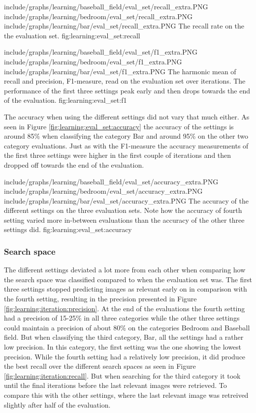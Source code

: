 \tripfigurenear
{include/graphs/learning/baseball_field/eval_set/recall_extra.PNG}
{include/graphs/learning/bedroom/eval_set/recall_extra.PNG}
{include/graphs/learning/bar/eval_set/recall_extra.PNG}
{The recall rate on the the evaluation set.}
{fig:learning:eval_set:recall}

\tripfigurenear
{include/graphs/learning/baseball_field/eval_set/f1_extra.PNG}
{include/graphs/learning/bedroom/eval_set/f1_extra.PNG}
{include/graphs/learning/bar/eval_set/f1_extra.PNG}
{The harmonic mean of recall and precision, F1-measure, read on the evaluation set over iterations. The performance of the first three settings peak early and then drops towards the end of the evaluation.}
{fig:learning:eval_set:f1}

The accuracy when using the different settings did not vary that much either. As seen in Figure \ref{fig:learning:eval_set:accuracy} the accuracy of the settings is around 85\% when classifying the category Bar and around 95\% on the other two category evaluations. Just as with the F1-measure the accuracy measurements of the first three settings were higher in the first couple of iterations and then dropped off towards the end of the evaluation. 

\tripfigure
{include/graphs/learning/baseball_field/eval_set/accuracy_extra.PNG}
{include/graphs/learning/bedroom/eval_set/accuracy_extra.PNG}
{include/graphs/learning/bar/eval_set/accuracy_extra.PNG}
{The accuracy of the different settings on the three evaluation sets. Note how the accuracy of fourth setting varied more in-between evaluations than the accuracy of the other three settings did.}
{fig:learning:eval_set:accuracy}

\subsubsection{Search space}
\label{sec:res:learning:iter}
The different settings deviated a lot more from each other when comparing how the search space was classified compared to when the evaluation set was. The first three settings stopped predicting images as relevant early on in comparison with the fourth setting, resulting in the precision presented in Figure \ref{fig:learning:iteration:precision}. At the end of the evaluations the fourth setting had a precision of 15-25\% in all three categories while the other three settings could maintain a precision of about 80\% on the categories Bedroom and Baseball field. But when classifying the third category, Bar, all the settings had a rather low precision. In this category, the first setting was the one showing the lowest precision. While the fourth setting had a relatively low precision, it did produce the best recall over the different search spaces as seen in Figure \ref{fig:learning:iteration:recall}. But when searching for the third category it took until the final iterations before the last relevant images were retrieved. To compare this with the other settings, where the last relevant image was retreived slightly after half of the evaluation. 


